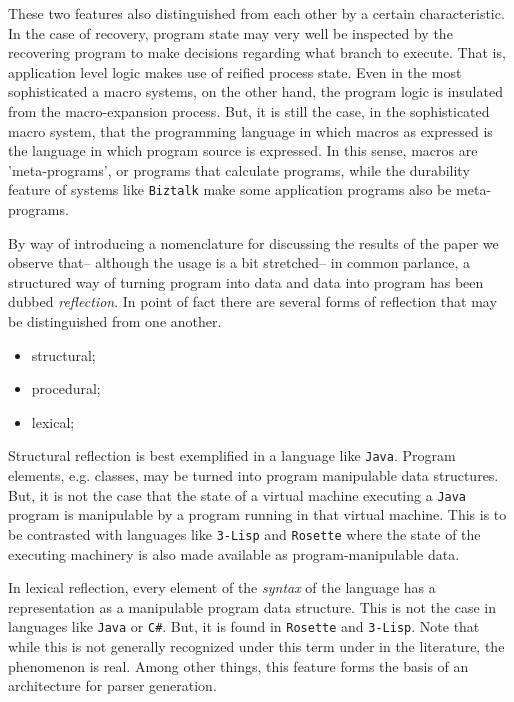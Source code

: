 \documentclass{amsart}
\theoremstyle{definition}
\theoremstyle{remark}
\numberwithin{equation}{subsection}
\begin{document}
These two features also distinguished from each other by a certain
characteristic. In the case of recovery, program state may very well
be inspected by the recovering program to make decisions regarding
what branch to execute. That is, application level logic makes use of
reified process state. Even in the most sophisticated a macro systems,
on the other hand, the program logic is insulated from the
macro-expansion process. But, it is still the case, in the
sophisticated macro system, that the programming language in which
macros as expressed is the language in which program source is
expressed. In this sense, macros are 'meta-programs', or programs that
calculate programs, while the durability feature of systems like
\texttt{Biztalk} make some application programs also be meta-programs.
 
By way of introducing a nomenclature for discussing the results of the
paper we observe that-- although the usage is a bit stretched-- in
common parlance, a structured way of turning program into data and
data into program has been dubbed \textit{reflection}. In point of
fact there are several forms of reflection that may be distinguished
from one another.

\begin{itemize}
	\item structural;
	\item procedural;
	\item lexical;
\end{itemize}

Structural reflection is best exemplified in a language like
\texttt{Java}. Program elements, e.g. classes, may be turned into
program manipulable data structures. But, it is not the case that the
state of a virtual machine executing a \texttt{Java} program is
manipulable by a program running in that virtual machine. This is to
be contrasted with languages like \texttt{3-Lisp} and \texttt{Rosette}
where the state of the executing machinery is also made available as
program-manipulable data.

In lexical reflection, every element of the \textit{syntax} of the
language has a representation as a manipulable program data
structure. This is not the case in languages like \texttt{Java} or
\texttt{C\#}. But, it is found in \texttt{Rosette} and
\texttt{3-Lisp}. Note that while this is not generally recognized
under this term under in the literature, the phenomenon is real. Among
other things, this feature forms the basis of an architecture for
parser generation.
\end{document}
